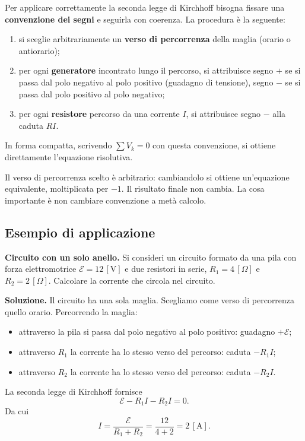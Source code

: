 Per applicare correttamente la seconda legge di Kirchhoff bisogna fissare una \textbf{convenzione dei segni} e seguirla con coerenza. La procedura è la seguente:

\begin{enumerate}[leftmargin=1cm]
  \item si sceglie arbitrariamente un \textbf{verso di percorrenza} della maglia (orario o antiorario);
  \item per ogni \textbf{generatore} incontrato lungo il percorso, si attribuisce segno \(+\) se si passa dal polo negativo al polo positivo (guadagno di tensione), segno \(-\) se si passa dal polo positivo al polo negativo;
  \item per ogni \textbf{resistore} percorso da una corrente \(I\), si attribuisce segno \(-\) alla caduta \(RI\).
\end{enumerate}

In forma compatta, scrivendo \(\sum V_k = 0\) con questa convenzione, si ottiene direttamente l'equazione risolutiva.

\begin{attenzione}
Il verso di percorrenza scelto è arbitrario: cambiandolo si ottiene un'equazione equivalente, moltiplicata per \(-1\). Il risultato finale non cambia. La cosa importante è non cambiare convenzione a metà calcolo.
\end{attenzione}

\subsection{Esempio di applicazione}

\begin{esempio}
\textbf{Circuito con un solo anello.} Si consideri un circuito formato da una pila con forza elettromotrice \(\mathcal{E} = 12\,[\text{V}]\) e due resistori in serie, \(R_1 = 4\,[\Omega]\) e \(R_2 = 2\,[\Omega]\). Calcolare la corrente che circola nel circuito.

\smallskip
\textbf{Soluzione.} Il circuito ha una sola maglia. Scegliamo come verso di percorrenza quello orario. Percorrendo la maglia:

\begin{itemize}[leftmargin=1cm]
  \item attraverso la pila si passa dal polo negativo al polo positivo: guadagno \(+\mathcal{E}\);
  \item attraverso \(R_1\) la corrente ha lo stesso verso del percorso: caduta \(-R_1 I\);
  \item attraverso \(R_2\) la corrente ha lo stesso verso del percorso: caduta \(-R_2 I\).
\end{itemize}

La seconda legge di Kirchhoff fornisce
\[
\mathcal{E} - R_1 I - R_2 I = 0.
\]
Da cui
\[
I = \frac{\mathcal{E}}{R_1 + R_2} = \frac{12}{4 + 2} = 2\,[\text{A}].
\]
\end{esempio}

